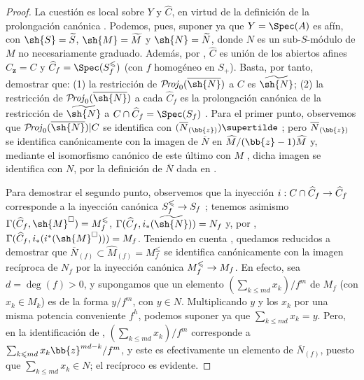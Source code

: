 \documentclass[oneside,10pt]{amsart}
\makeatletter
\renewcommand{\leq}{\leqslant}
\newcommand{\ega@arrow}[2]{\mathchoice{#1}{#2}{#2}{#2}}
\renewcommand{\to}{\ega@arrow{\longrightarrow}{\rightarrow}}
\def\shProj{\mathcal{P}\!\mathit{roj}}
\makeatother
\begin{document}
\begin{proof}
La cuestión es local sobre $Y$ y $\widehat{C}$, en virtud de la definición de la prolongación canónica .
Podemos, pues, suponer ya que $Y=\Spec(A)$ es afín, con $\sh{S}=\widetilde{S}$, $\sh{M}=\widetilde{M}$ y $\sh{N}=\widetilde{N}$, donde $N$ es un sub-$S$-módulo de $M$ no necesariamente graduado.
Además, por , $\widehat{C}$ es unión de los abiertos afines $\widehat C_{\mathbf z}=C$ y $\widehat{C}_f=\Spec(S_f^\leq)$ (con $f$ homogéneo en $S_+$).
Basta, por tanto, demostrar que: (1) la restricción de $\shProj_0(\overline{\sh{N}})$ a $C$ es $\widetilde{\sh{N}}$; (2) la restricción de $\shProj_0(\overline{\sh{N}})$ a cada $\widehat{C}_f$ es la prolongación canónica de la restricción de $\widetilde{\sh{N}}$ a $C\cap\widehat{C}_f=\Spec(S_f)$ .
Para el primer punto, observemos que $\shProj_0(\overline{\sh{N}})|C$ se identifica con $(\overline{N}_{(\bb{z})})\supertilde$ ;
pero $\overline{N}_{(\bb{z})}$ se identifica canónicamente  con la imagen de $\overline{N}$ en $\widehat{M}/(\bb{z}-1)\widehat{M}$ y, mediante el isomorfismo canónico de este último con $M$ , dicha imagen se identifica con $N$, por la definición de $\overline{N}$ dada en .

Para demostrar el segundo punto, observemos que la inyección $i:C\cap\widehat{C}_f\to\widehat{C}_f$ corresponde a la inyección canónica $S_f^\leq\to S_f$ ;
tenemos asimismo $\Gamma(\widehat{C}_f,\sh{M}^\square)=M_f^\leq$, $\Gamma(\widehat{C}_f,i_*(\widetilde{\sh{N}}))=N_f$ y, por , $\Gamma(\widehat{C}_f,i_*(i^*(\sh{M}^\square)))=M_f$.
Teniendo en cuenta , quedamos reducidos a demostrar que $\overline{N}_{(f)}\subset\widehat{M}_{(f)}=M_f^\leq$ se identifica canónicamente con la imagen recíproca de $N_f$ por la inyección canónica $M_f^\leq\to M_f$.
En efecto, sea $d=\deg(f)>0$, y supongamos que un elemento $(\sum_{k\leq md}x_k)/f^m$ de $M_f$ (con $x_k\in M_k$) es de la forma $y/f^m$, con $y\in N$.
Multiplicando $y$ y los $x_k$ por una misma potencia conveniente $f^h$, podemos suponer ya que $\sum_{k\leq md}x_k=y$.
Pero, en la identificación de , $(\sum_{k\leq md}x_k)/f^m$ corresponde a $\sum_{k\leq md}x_k\bb{z}^{md-k}/f^m$, y este es efectivamente un elemento de $\overline{N}_{(f)}$, puesto que $\sum_{k\leq md}x_k\in N$;
el recíproco es evidente.
\end{proof}
\end{document}
